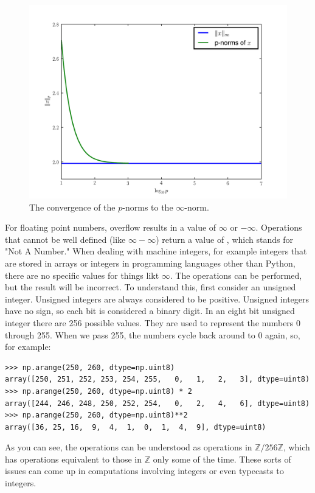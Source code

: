 \begin{figure}
\includegraphics[width=\textwidth]{pnorm_convergence.pdf}
\caption{The convergence of the $p$-norms to the $\infty$-norm.}
\end{figure}

For floating point numbers, overflow results in a value of $\infty$ or $-\infty$.
Operations that cannot be well defined (like $\infty - \infty$) return a value of , which stands for "Not A Number."
When dealing with machine integers, for example integers that are stored in arrays or integers in programming languages other than Python, there are no specific values for things likt $\infty$.
The operations can be performed, but the result will be incorrect.
To understand this, first consider an unsigned integer.
Unsigned integers are always considered to be positive.
Unsigned integers have no sign, so each bit is considered a binary digit.
In an eight bit unsigned integer there are 256 possible values.
They are used to represent the numbers 0 through 255.
When we pass 255, the numbers cycle back around to 0 again, so, for example:
\begin{lstlisting}
>>> np.arange(250, 260, dtype=np.uint8)
array([250, 251, 252, 253, 254, 255,   0,   1,   2,   3], dtype=uint8)
>>> np.arange(250, 260, dtype=np.uint8) * 2
array([244, 246, 248, 250, 252, 254,   0,   2,   4,   6], dtype=uint8)
>>> np.arange(250, 260, dtype=np.uint8)**2
array([36, 25, 16,  9,  4,  1,  0,  1,  4,  9], dtype=uint8)
\end{lstlisting}
As you can see, the operations can be understood as operations in $\mathbb{Z} / 256 \mathbb{Z}$, which has operations equivalent to those in $\mathbb{Z}$ only some of the time.
These sorts of issues can come up in computations involving integers or even typecasts to integers.

